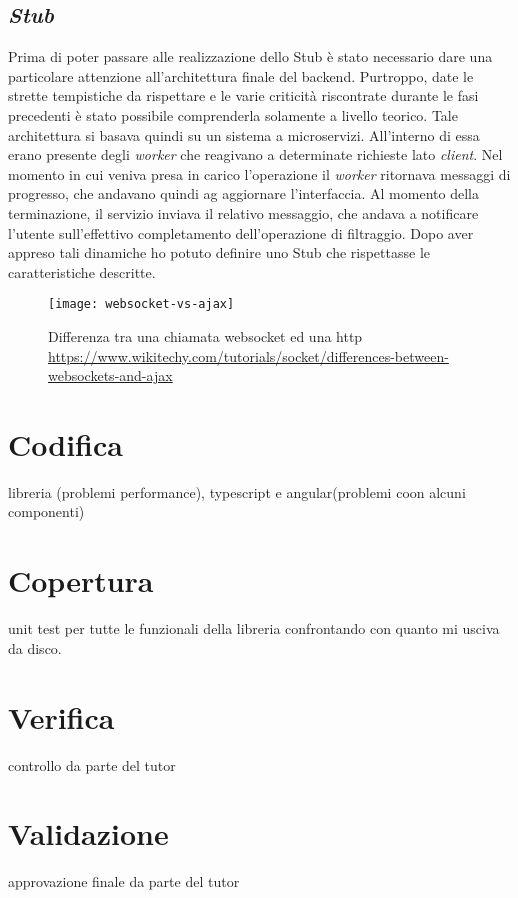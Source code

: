 \subsection{\textit{Stub}}
Prima di poter passare alle realizzazione dello Stub è stato necessario dare una particolare attenzione all'architettura finale del backend. Purtroppo, date le strette tempistiche da rispettare e le varie criticità riscontrate durante le fasi precedenti è stato possibile comprenderla solamente a livello teorico. Tale architettura si basava quindi su un sistema a microservizi. All'interno di essa erano presente degli \textit{worker} che reagivano a determinate richieste lato \textit{client}. Nel momento in cui veniva presa in carico l'operazione il \textit{worker} ritornava messaggi di progresso, che andavano quindi ag aggiornare l'interfaccia. Al momento della terminazione, il servizio inviava il relativo messaggio, che andava a notificare l'utente sull'effettivo completamento dell'operazione di filtraggio. Dopo aver appreso tali dinamiche ho potuto definire uno Stub che rispettasse le caratteristiche descritte.
\begin{figure}[!h] 
	\centering 
	\texttt{[image: websocket-vs-ajax]} 
	\caption{Differenza tra una chiamata websocket ed una http \url{https://www.wikitechy.com/tutorials/socket/differences-between-websockets-and-ajax}}
\end{figure}
\newpage
\section{Codifica}
libreria (problemi performance), typescript e angular(problemi coon alcuni componenti)
\section{Copertura}
unit test per tutte le funzionali della libreria confrontando con quanto mi usciva da disco.
\section{Verifica}
controllo da parte del tutor
\section{Validazione}
approvazione finale da parte del tutor